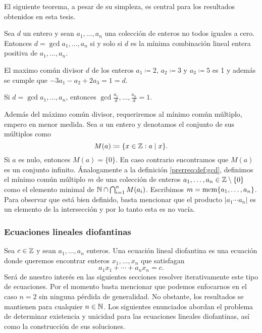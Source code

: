 El siguiente teorema, a pesar de su simpleza, es central para los resultados obtenidos en esta
tesis.
\begin{theorem}
	\label{prerreq:th:bezout}
	Sea $d$ un entero y sean $a_1, \ldots, a_n$ una colección de enteros no todos iguales a cero.
	Entonces $d = \gcd{a_1, \ldots, a_n}$ si y solo si $d$ es la mínima combinación lineal entera
	positiva de $a_1, \ldots, a_n$.
\end{theorem}

\begin{example}
	El maximo común divisor $d$ de los enteros $a_1 \coloneq 2$, $a_2 \coloneq 3$ y $a_3 \coloneq 5$
	es 1 y además se cumple que $-3a_1 - a_2 + 2a_3 = 1 = d$.
\end{example}

\begin{lemma}
	\label{prerreq:lemma:gcd}
	Si $d = \gcd{a_1, \ldots, a_n}$, entonces $\gcd{\frac{a_1}{d}, \ldots, \frac{a_n}{d}} = 1$.
\end{lemma}

Además del máximo común divisor, requeriremos al mínimo común múltiplo, empero en menor medida. Sea
$a$ un entero y denotamos el conjunto de sus múltiplos como
\begin{equation*}
	M(a) \coloneq \lbrace x \in \mathbb{Z} \vcentcolon a \mid x \rbrace.
\end{equation*}
Si $a$ es nulo, entonces $M(a) = \lbrace 0 \rbrace$. En caso contrario encontramos que $M(a)$ es un
conjunto infinito. Ánalogamente a la definición \ref{prerreq:def:gcd}, definimos el mínimo común
múltiplo $m$ de una colección de enteros $a_1, \ldots, a_n \in \mathbb{Z} \setminus \lbrace 0 \rbrace$ como
el elemento minimal de $\mathbb{N} \cap \bigcap_{i=1}^{n}M(a_i)$. Escribimos $m = \mathop{\mathrm{mcm}{\left\lbrace a_1, \ldots, a_n \right\rbrace}}$.
Para observar que está bien definido, basta mencionar que el producto $|a_1 \cdots a_n|$ es un
elemento de la intersección y por lo tanto esta es no vacía.

\subsubsection{Ecuaciones lineales diofantinas}

\noindent
Sea $c \in \mathbb{Z}$ y sean $a_1, \ldots, a_n$ enteros. Una ecuación lineal diofantina es una ecuación
donde queremos encontrar enteros $x_1, \ldots, x_n$ que satisfagan
\begin{equation*}
	a_1x_1 + \cdots + a_nx_n = c.
\end{equation*}
Será de nuestro interés en las siguientes secciones resolver iterativamente este tipo de ecuaciones.
Por el momento basta mencionar que podemos enfocarnos en el caso $n = 2$ sin ninguna pérdida de
generalidad. No obstante, los resultados se mantienen para cualquier $n \in \mathbb{N}$. Los siguientes
enunciados abordan el problema de determinar existencia y unicidad para las ecuaciones lineales
diofantinas, así como la construcción de sus soluciones.

